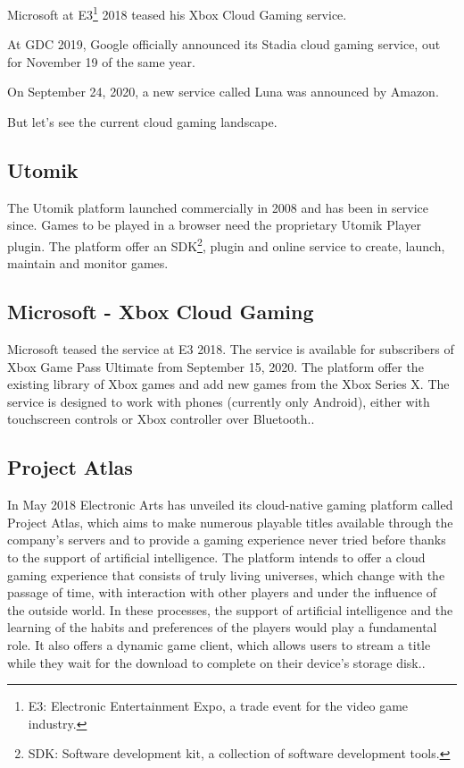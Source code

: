 Microsoft at E3\footnote{E3: Electronic Entertainment Expo, a trade event for the video game industry.} 2018 teased his Xbox Cloud Gaming service.

At GDC 2019, Google officially announced its Stadia cloud gaming service, out for November 19 of the same year.

On September 24, 2020, a new service called Luna was announced by Amazon\cite{Cloud_gaming_history}.

But let's see the current cloud gaming landscape.

\subsection{Utomik}
The Utomik platform launched commercially in 2008 and has been in service since. Games to be played in a browser need the proprietary Utomik Player plugin. The platform offer an SDK\footnote{SDK: Software development kit, a collection of software development tools.}, plugin and online service to create, launch, maintain and monitor games\cite{Utomik}.

\subsection{Microsoft - Xbox Cloud Gaming}
Microsoft teased the service at E3 2018. The service is available for subscribers of Xbox Game Pass Ultimate from September 15, 2020. The platform offer the existing library of Xbox games and add new games from the Xbox Series X. The service is designed to work with phones (currently only Android), either with touchscreen controls or Xbox controller over Bluetooth.\cite{Xbox_Game_Pass_cloud_gaming}.

\subsection{Project Atlas}
In May 2018 Electronic Arts has unveiled its cloud-native gaming platform called Project Atlas, which aims to make numerous playable titles available through the company's servers and to provide a gaming experience never tried before thanks to the support of artificial intelligence. The platform intends to offer a cloud gaming experience that consists of truly living universes, which change with the passage of time, with interaction with other players and under the influence of the outside world. In these processes, the support of artificial intelligence and the learning of the habits and preferences of the players would play a fundamental role. It also offers a dynamic game client, which allows users to stream a title while they wait for the download to complete on their device's storage disk.\cite{Project_Atlas}.

